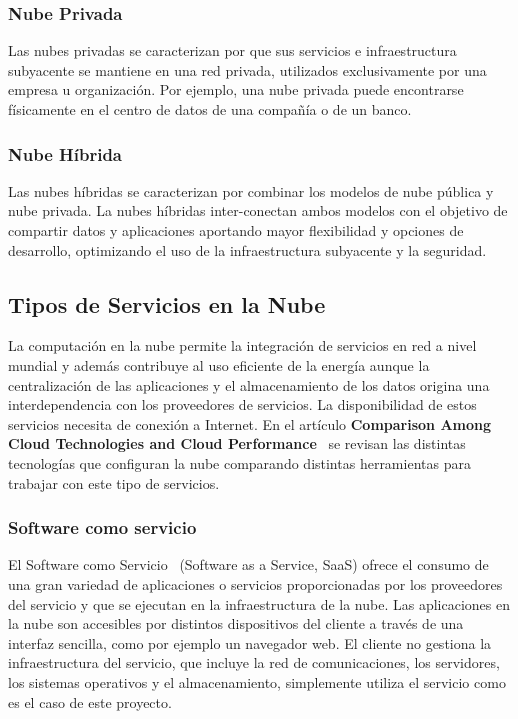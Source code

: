 \documentclass[a4paper,11pt]{book}
\begin{document}
\subsubsection{Nube Privada}
Las nubes privadas se caracterizan por que sus servicios e infraestructura subyacente se mantiene en una red privada, utilizados exclusivamente por una empresa u organización. Por ejemplo, una nube privada puede encontrarse físicamente en el centro de datos de una compañía o de un banco.

\subsubsection{Nube Híbrida}

Las nubes híbridas se caracterizan por combinar los modelos de nube pública y nube privada. La nubes híbridas inter-conectan ambos modelos con el objetivo de compartir datos y aplicaciones aportando mayor flexibilidad y opciones de desarrollo, optimizando el uso de la infraestructura subyacente y la seguridad.


\subsection{Tipos de Servicios en la Nube}

La computación en la nube permite la integración de servicios en red a nivel mundial y además contribuye al uso eficiente de la energía aunque la centralización de las aplicaciones y el almacenamiento de los datos origina una interdependencia con los proveedores de servicios. La disponibilidad de estos servicios necesita de conexión a Internet.  En el artículo \textbf{Comparison Among Cloud Technologies and Cloud Performance}~\cite{cloudtech} se revisan las distintas tecnologías que configuran la nube comparando distintas herramientas para trabajar con este tipo de servicios.

\subsubsection{Software como servicio}\label{secsaas}

El Software como Servicio~\cite{saas} (Software as a Service, SaaS) ofrece el consumo de una gran variedad de aplicaciones o servicios proporcionadas por los proveedores del servicio y que se ejecutan en la infraestructura de la nube. Las aplicaciones en la nube son accesibles por distintos dispositivos del cliente a través de una interfaz sencilla, como por ejemplo un navegador web. El cliente no gestiona la infraestructura del servicio, que incluye la red de comunicaciones, los servidores, los sistemas operativos y el almacenamiento, simplemente utiliza el servicio como es el caso de este proyecto.
\end{document}
